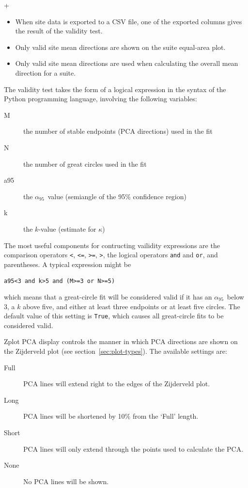 \documentclass[a4paper,british]{article}
\newcommand{\menuitemlabel}[1]{%
\mbox{\textsf{#1}}\hfil}
\newenvironment{menuitemlist}%
{\begin{list}{}{%
\renewcommand{\makelabel}{\menuitemlabel}%
\setlength{\labelwidth}{35pt}%
\setlength{\leftmargin}%
             {\labelwidth+\labelsep}}}%
{\end{list}}
\newcommand{\caps}[1]{\MakeTextUppercase{#1}} %
\newcommand{\alnifi}{$\alpha_{95}$}
\begin{document}
\begin{menuitemlist}
\begin{itemize}
    \item When site data is exported to a CSV file, one of the exported
      columns gives the result of the validity test.

    \item Only valid site mean directions are shown on the suite equal-area
      plot.

    \item Only valid site mean directions are used when calculating the
      overall mean direction for a suite.

  \end{itemize}

  The validity test takes the form of a logical expression in the syntax of
  the Python programming language, involving the following variables:

\begin{description}
  \item[M] the number of stable endpoints (\caps{pca} directions) used in the fit
  \item[N] the number of great circles used in the fit
  \item[a95] the \alnifi\ value (semiangle of the 95\% confidence region)
  \item[k] the $k$-value (estimate for $\kappa$)
\end{description}

The most useful components for contructing vailidity expressions are the
comparison operators \texttt{<}, \texttt{<=}, \texttt{>=}, \texttt{>}, the
logical operators \texttt{and} and \texttt{or}, and parentheses. A typical
expression might be

\centerline{\texttt{a95<3 and k>5 and (M>=3 or N>=5)}}

which means that a great-circle fit will be considered valid if it has an
\alnifi\ below 3, a $k$ above five, and either at least three endpoints or
at least five circles. The default value of this setting is \texttt{True},
which causes all great-circle fits to be considered valid.

\item[Zplot \caps{pca} display] controls the manner in which \caps{pca}
  directions are shown on the Zijderveld plot (see
  section~\ref{sec:plot-types}). The available settings are:

\begin{description}
\item[Full] \caps{pca} lines will extend right to the edges of the Zijderveld
  plot.
\item[Long] \caps{pca} lines will be shortened by 10\% from the `Full' length.
\item[Short] \caps{pca} lines will only extend through the points used to calculate
  the \caps{pca}.
\item[None] No \caps{pca} lines will be shown.
\end{description}


\end{menuitemlist}
\end{document}
